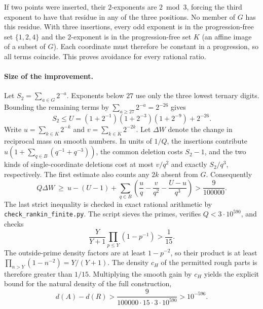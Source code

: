 If two points were inserted, their $2$-exponents are $2\bmod3$, forcing
the third exponent to have that residue in any of the three positions.
No member of $G$ has this residue. With three insertions, every odd exponent
is in the progression-free set $\{1,2,4\}$ and the $2$-exponent is in the progression-free set $K$ (an affine image of a subset of $G$). Each coordinate
must therefore be constant in a progression, so all terms coincide.
This proves avoidance for every rational ratio.

\paragraph{Size of the improvement.}
Let $S_2=\sum_{a\in G}2^{-a}$. Exponents below $27$ use only the
three lowest ternary digits. Bounding the remaining terms by
$\sum_{a\ge27}2^{-a}=2^{-26}$ gives
\[
 S_2\le U=(1+2^{-1})(1+2^{-3})(1+2^{-9})+2^{-26}.
\]
Write $u=\sum_{k\in K}2^{-k}$ and $v=\sum_{k\in K}2^{-2k}$.
Let $\Delta W$ denote the change in reciprocal mass on smooth numbers.
In units of $1/Q$, the insertions contribute $u(1+\sum_{q\in B}(q^{-1}+q^{-3}))$,
the common deletion costs $S_2-1$, and the two kinds of
single-coordinate deletions cost at most $v/q^2$ and exactly $S_2/q^3$,
respectively. The first estimate also counts any $2k$ absent from $G$. Consequently
\[
 Q\Delta W\ \ge\ u-(U-1)
     +\sum_{q\in B}\left(\frac{u}{q}-\frac{v}{q^2}-\frac{U-u}{q^3}\right)
       >\frac9{100000}.
\]
The last strict inequality is checked in exact rational arithmetic by
\texttt{check\_rankin\_finite.py}. The script sieves the primes, verifies
$Q<3\cdot10^{590}$, and checks
\[
          \frac{Y}{Y+1}\prod_{p\le Y}(1-p^{-1})>\frac1{15}.
\]
The outside-prime density factors are at least $1-p^{-2}$, so
their product is at least $\prod_{n>Y}(1-n^{-2})=Y/(Y+1)$.
The density $c_H$ of the permitted rough parts is therefore greater
than $1/15$. Multiplying the smooth gain by $c_H$ yields the explicit
bound for the natural density of the full construction,
\[
              d(A)-d(R) > \frac{9}{100000\cdot15\cdot3\cdot10^{590}}
                           > 10^{-596}.
\]
